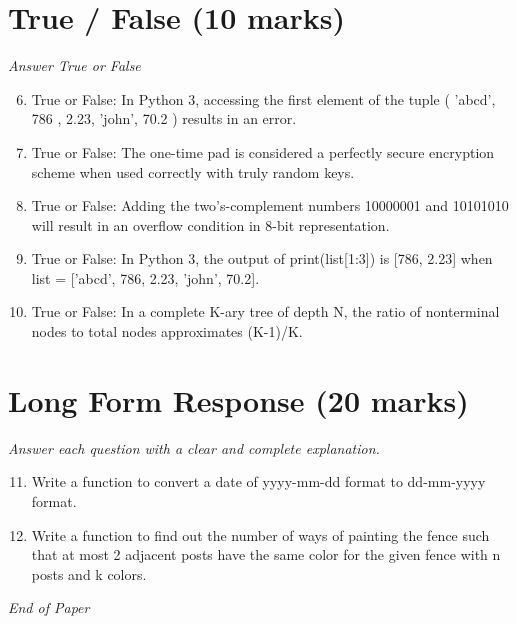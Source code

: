 \documentclass[12pt]{article}
\begin{document}
\section*{True / False (10 marks)}
\textit{Answer True or False}
\begin{enumerate}[label=\arabic*.]
\setcounter{enumi}{5}
\item True or False: In Python 3, accessing the first element of the tuple ( 'abcd', 786 , 2.23, 'john', 70.2 ) results in an error.
\item True or False: The one-time pad is considered a perfectly secure encryption scheme when used correctly with truly random keys.
\item True or False: Adding the two's-complement numbers 10000001 and 10101010 will result in an overflow condition in 8-bit representation.
\item True or False: In Python 3, the output of print(list[1:3]) is [786, 2.23] when list = ['abcd', 786, 2.23, 'john', 70.2].
\item True or False: In a complete K-ary tree of depth N, the ratio of nonterminal nodes to total nodes approximates (K-1)/K.
\end{enumerate}

\section*{Long Form Response (20 marks)}
\textit{Answer each question with a clear and complete explanation.}
\begin{enumerate}[label=\arabic*.]
\setcounter{enumi}{10}
\item Write a function to convert a date of yyyy-mm-dd format to dd-mm-yyyy format.
\item Write a function to find out the number of ways of painting the fence such that at most 2 adjacent posts have the same color for the given fence with n posts and k colors.
\end{enumerate}

\vfill
\noindent\textit{End of Paper}
\end{document}
